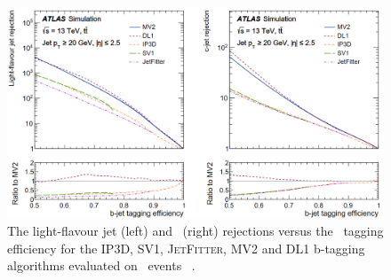 \begin{figure}[bth]
	\includegraphics[width=.9\textwidth]{FTAG_plots/b-tagging-perfermance.png}
	\caption{The light-flavour jet (left) and \cjet\ (right) rejections versus 
	the \bjet\ tagging efficiency for the IP3D, SV1, \textsc{JetFitter}, MV2 and
	DL1 b-tagging algorithms evaluated on \ttbar\ events
	~\cite{FTAG-2018-01}.}\label{fig:b-tagging-performance}
\end{figure}


